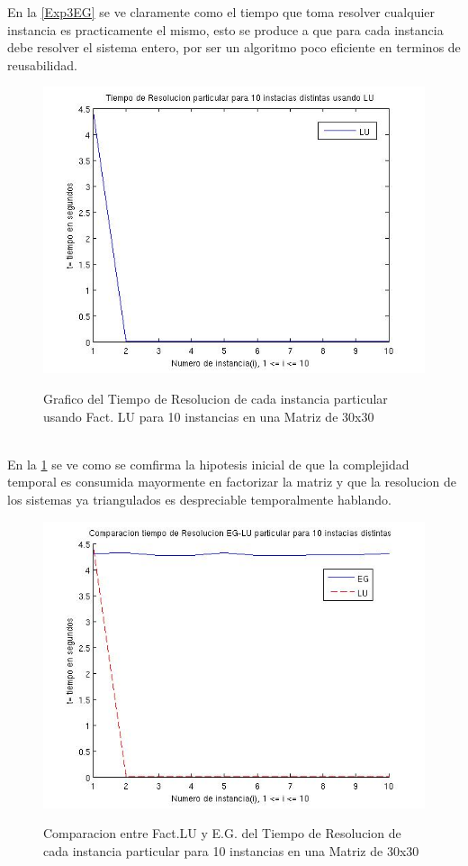 \documentclass[12pt,a4paper]{article}
\begin{document}
En la \ref{Exp3EG} se ve claramente como el tiempo que toma resolver cualquier instancia es practicamente el mismo, esto se produce a que para cada instancia debe resolver el sistema entero, por ser un algoritmo poco eficiente en terminos de reusabilidad.
\begin{figure}[h!]
\centering
\caption{Grafico del Tiempo de Resolucion de cada instancia particular usando Fact. LU para 10 instancias en una Matriz de 30x30}
\includegraphics[width=12cm]{tmp10InstFijasLU.jpg}
\label{Exp3LU}
\end{figure}
\\
En la \ref{Exp3LU} se ve como se comfirma la hipotesis inicial de que la complejidad temporal es consumida mayormente en factorizar la matriz y que la resolucion de los sistemas ya triangulados es despreciable temporalmente hablando.
\begin{figure}[h!]
\centering
\caption{Comparacion entre Fact.LU y E.G. del Tiempo de Resolucion de cada instancia particular para 10 instancias en una Matriz de 30x30}
\includegraphics[width=13cm]{CompLUEG10InstFijas.jpg}
\label{Exp3Comp}
\end{figure}
\end{document}
